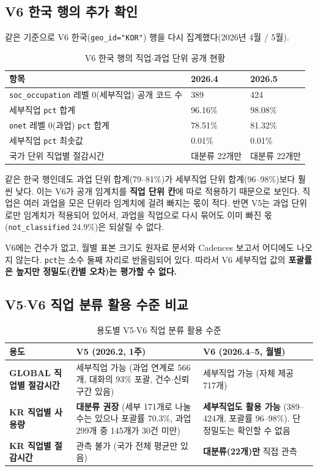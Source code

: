 \documentclass[11pt]{article}
\begin{document}
\subsection{V6 한국 행의 추가 확인}

같은 기준으로 V6 한국(\texttt{geo\_id="KOR"}) 행을 다시 집계했다(2026년 4월 / 5월).

\begin{longtable}{L{9.0cm}L{2.8cm}L{2.8cm}}
\caption{V6 한국 행의 직업$\cdot$과업 단위 공개 현황}\label{tab:v6kor}\\
\toprule
항목 & 2026.4 & 2026.5 \\
\midrule
\endhead
\texttt{soc\_occupation} 레벨 0(세부직업) 공개 코드 수 & 389 & 424 \\
세부직업 \texttt{pct} 합계 & 96.16\% & 98.08\% \\
\texttt{onet} 레벨 0(과업) \texttt{pct} 합계 & 78.51\% & 81.32\% \\
세부직업 \texttt{pct} 최솟값 & 0.01\% & 0.01\% \\
국가 단위 직업별 절감시간 & 대분류 22개만 & 대분류 22개만 \\
\bottomrule
\end{longtable}

같은 한국 행인데도 과업 단위 합계(79--81\%)가 세부직업 단위 합계(96--98\%)보다 훨씬 낮다. 이는 V6가 공개 임계치를 \textbf{직업 단위 칸}에 따로 적용하기 때문으로 보인다. 직업은 여러 과업을 모은 단위라 임계치에 걸려 빠지는 몫이 적다. 반면 V5는 과업 단위로만 임계치가 적용되어 있어서, 과업을 직업으로 다시 묶어도 이미 빠진 몫(\texttt{not\_classified} 24.9\%)은 되살릴 수 없다.

V6에는 건수가 없고, 월별 표본 크기도 원자료 문서와 Cadences 보고서\parencite{massenkoff-2026-cadences} 어디에도 나오지 않는다. \texttt{pct}는 소수 둘째 자리로 반올림되어 있다. 따라서 V6 세부직업 값의 \textbf{포괄률은 높지만 정밀도(칸별 오차)는 평가할 수 없다.}

\subsection{V5$\cdot$V6 직업 분류 활용 수준 비교}

\begin{longtable}{L{3.4cm}L{5.6cm}L{5.6cm}}
\caption{용도별 V5$\cdot$V6 직업 분류 활용 수준}\label{tab:v5v6}\\
\toprule
용도 & V5 (2026.2, 1주) & V6 (2026.4--5, 월별) \\
\midrule
\endhead
\textbf{GLOBAL 직업별 절감시간} & 세부직업 가능 (과업 연계로 566개, 대화의 93\% 포괄, 건수$\cdot$신뢰구간 있음) & 세부직업 가능 (자체 제공 717개) \\
\textbf{KR 직업별 사용량} & \textbf{대분류 권장} (세부 171개로 나눌 수는 있으나 포괄률 70.3\%, 과업 299개 중 145개가 30건 미만) & \textbf{세부직업도 활용 가능} (389--424개, 포괄률 96--98\%). 단 정밀도는 확인할 수 없음 \\
\textbf{KR 직업별 절감시간} & 관측 불가 (국가 전체 평균만 있음) & \textbf{대분류(22개)만} 직접 관측 \\
\bottomrule
\end{longtable}
\end{document}
